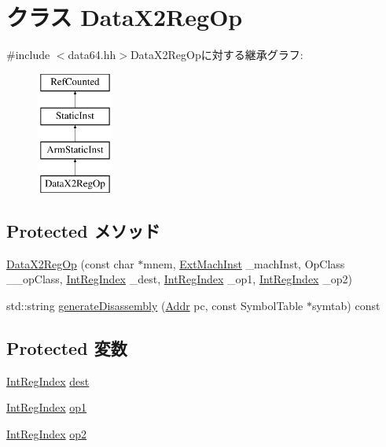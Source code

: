 \hypertarget{classArmISA_1_1DataX2RegOp}{
\section{クラス DataX2RegOp}
\label{classArmISA_1_1DataX2RegOp}
}


{\ttfamily \#include $<$data64.hh$>$}DataX2RegOpに対する継承グラフ:\begin{figure}[H]
\begin{center}
\leavevmode
\includegraphics[height=4cm]{classArmISA_1_1DataX2RegOp}
\end{center}
\end{figure}
\subsection*{Protected メソッド}
\begin{DoxyCompactItemize}
\item 
\hyperlink{classArmISA_1_1DataX2RegOp_a8175685987c62cc668a8b0537e4fd02d}{DataX2RegOp} (const char $\ast$mnem, \hyperlink{classStaticInst_a5605d4fc727eae9e595325c90c0ec108}{ExtMachInst} \_\-machInst, OpClass \_\-\_\-opClass, \hyperlink{namespaceArmISA_ae64680ba9fb526106829d6bf92fc791b}{IntRegIndex} \_\-dest, \hyperlink{namespaceArmISA_ae64680ba9fb526106829d6bf92fc791b}{IntRegIndex} \_\-op1, \hyperlink{namespaceArmISA_ae64680ba9fb526106829d6bf92fc791b}{IntRegIndex} \_\-op2)
\item 
std::string \hyperlink{classArmISA_1_1DataX2RegOp_a95d323a22a5f07e14d6b4c9385a91896}{generateDisassembly} (\hyperlink{classm5_1_1params_1_1Addr}{Addr} pc, const SymbolTable $\ast$symtab) const 
\end{DoxyCompactItemize}
\subsection*{Protected 変数}
\begin{DoxyCompactItemize}
\item 
\hyperlink{namespaceArmISA_ae64680ba9fb526106829d6bf92fc791b}{IntRegIndex} \hyperlink{classArmISA_1_1DataX2RegOp_aec72e8e45bdc87abeeeb75d2a8a9a716}{dest}
\item 
\hyperlink{namespaceArmISA_ae64680ba9fb526106829d6bf92fc791b}{IntRegIndex} \hyperlink{classArmISA_1_1DataX2RegOp_a4c465c43ad568f8bcf8ae71480e9cfea}{op1}
\item 
\hyperlink{namespaceArmISA_ae64680ba9fb526106829d6bf92fc791b}{IntRegIndex} \hyperlink{classArmISA_1_1DataX2RegOp_a7799ff6cbe5a252199059eb8665820e7}{op2}
\end{DoxyCompactItemize}


